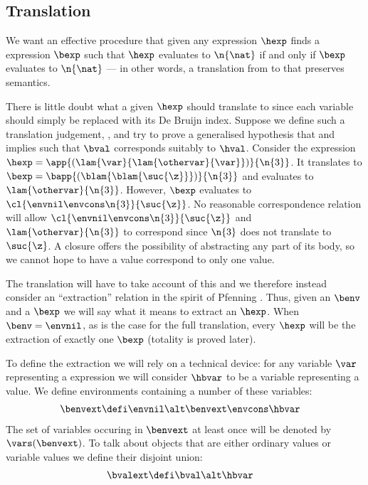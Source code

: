 \subsection{Translation}
We want an effective procedure that given any \hlang expression $\hexp$ finds a \blang expression $\bexp$ such that $\hexp$ evaluates to $\n{\nat}$ if and only if $\bexp$ evaluates to $\n{\nat}$ --- in other words, a translation from \hlang to \blang that preserves semantics.

There is little doubt what a given $\hexp$ should translate to since each variable should simply be replaced with its De Bruijn index.
Suppose we define such a translation judgement, \trahbfaux{\hexp}{\bexp}, and try to prove a generalised hypothesis that \trahbfaux{\hexp}{\bexp} and \hev{\hexp}{\hval} implies \bev{\benv}{\bexp}{\bval} such that $\bval$ corresponds suitably to $\hval$.
Consider the expression $\hexp = \app{(\lam{\var}{\lam{\othervar}{\var}})}{\n{3}}$.
It translates to $\bexp = \bapp{(\blam{\blam{\suc{\z}}})}{\n{3}}$ and evaluates to $\lam{\othervar}{\n{3}}$.
However, $\bexp$ evaluates to $\cl{\envnil \envcons \n{3}}{\suc{\z}}$.
No reasonable correspondence relation will allow $\cl{\envnil \envcons \n{3}}{\suc{\z}}$ and $\lam{\othervar}{\n{3}}$ to correspond since $\n{3}$ does not translate to $\suc{\z}$.
A closure offers the possibility of abstracting any part of its body, so we cannot hope to have a \hlang value correspond to only one \blang value.

The translation will have to take account of this and we therefore instead consider an ``extraction'' relation in the spirit of Pfenning \cite[p. 150]{Pfenning01}.
Thus, given an $\benv$ and a $\bexp$ we will say what it means to extract an $\hexp$.
When $\benv = \envnil$, as is the case for the full translation, every $\hexp$ will be the extraction of exactly one $\bexp$ (totality is proved later).

To define the extraction we will rely on a technical device: for any variable $\var$ representing a \hlang expression we will consider $\hbvar$ to be a variable representing a \blang value.
We define environments containing a number of these variables:
\begin{align*}
  \benvext &\defi \envnil \alt \benvext \envcons \hbvar
\end{align*}
The set of variables occuring in $\benvext$ at least once will be denoted by $\vars(\benvext)$.
To talk about objects that are either ordinary values or variable values we define their disjoint union:
\begin{align*}
  \bvalext &\defi \bval \alt \hbvar
\end{align*}

